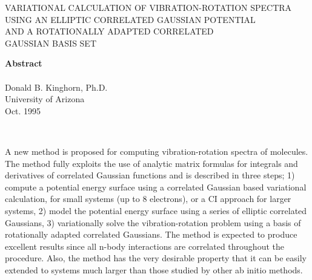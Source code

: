 \documentclass[12pt,thmsa]{article}
\begin{document}
\begin{center}
{VARIATIONAL CALCULATION OF VIBRATION-ROTATION SPECTRA\\ USING AN ELLIPTIC
CORRELATED GAUSSIAN POTENTIAL\\ AND A ROTATIONALLY ADAPTED CORRELATED \\ %
GAUSSIAN BASIS SET }

\textbf{Abstract} \\ \ \\ Donald B. Kinghorn, Ph.D. \\ University of Arizona %
\\ Oct. 1995
\end{center}

\ \newline
\newline

A new method is proposed for computing vibration-rotation spectra of
molecules. The method fully exploits the use of analytic matrix formulas for
integrals and derivatives of correlated Gaussian functions and is described
in three steps; 1) compute a potential energy surface using a correlated
Gaussian based variational calculation, for small systems (up to 8
electrons), or a CI approach for larger systems, 2) model the potential
energy surface using a series of elliptic correlated Gaussians, 3)
variationally solve the vibration-rotation problem using a basis of
rotationally adapted correlated Gaussians. The method is expected to produce
excellent results since all n-body interactions are correlated throughout
the procedure. Also, the method has the very desirable property that it can
be easily extended to systems much larger than those studied by other ab
initio methods. 
\end{document}

